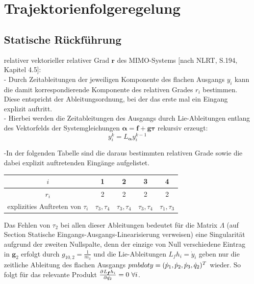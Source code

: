 \section{Trajektorienfolgeregelung}

\subsection{Statische Rückführung}
relativer vektorieller relativer Grad $\pmb{r}$ des MIMO-Systems [nach NLRT, S.194, Kapitel 4.5]:\\
- Durch Zeitableitungen der jeweiligen Komponente des flachen Ausgangs $y_i$ kann die damit korrespondierende Komponente des relativen Grades $r_i$ bestimmen. Diese entspricht der Ableitungsordnung, bei der das erste mal ein Eingang explizit auftritt.\\
- Hierbei werden die Zeitableitungen des Ausgangs durch Lie-Ableitungen entlang des Vektorfelds der Systemgleichungen $\pmb{\alpha} = \pmb{f} + \pmb{g} \pmb{\tau}$ rekursiv erzeugt: 
\begin{equation}
	y_i^{k} = L_{\pmb{\alpha}} y_i^{k-1}
\end{equation}

-In der folgenden Tabelle sind die daraus bestimmten relativen Grade sowie die dabei explizit auftretenden Eingänge aufgelistet.

\begin{center}
	\begin{tabular}{ |c||c|c|c|c| } 
		\hline
		$i$ & 1 & 2 & 3 & 4 \\ 
		\hline
		$r_i$ & 2 & 2 & 2 & 2\\ 
		\hline
		explizities Auftreten von $\tau_i$ & $\tau_3, \tau_4$ & $\tau_3, \tau_4$ & $\tau_3, \tau_4$ & $\tau_1, \tau_3$ \\ 
		\hline
	\end{tabular}
\end{center}

Das Fehlen von $\tau_2$ bei allen dieser Ableitungen bedeutet für die Matrix $\Lambda$ (auf Section Statische Eingangs-Ausgangs-Linearisierung verweisen) eine Singularität aufgrund der zweiten Nullspalte, denn der einzige von Null verschiedene Eintrag in $\pmb{g}_2$ erfolgt durch $g_{10, 2} = \frac{1}{m_3}$ und die Lie-Ableitungen $L_f h_i = \dot{y}_i$ geben nur die zeitliche Ableitung des flachen Ausgangs $\\pmb{dot{y}} = (\dot{p}_1, \dot{p}_2, \dot{p}_3, \dot{q}_2)^T$ wieder. So folgt für das relevante Produkt $\frac{\partial^{}L_{\pmb{f}} h_i}{\partial{\dot{q_2}}^{}} = 0 \ \forall i$.

